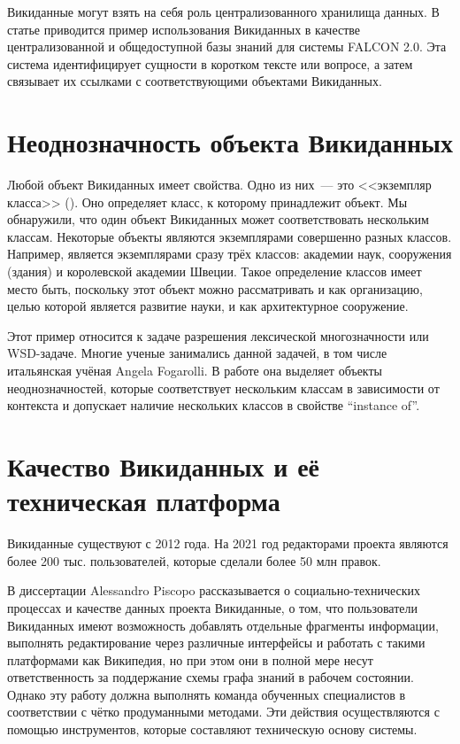 Викиданные могут взять на себя роль централизованного хранилища данных. В статье\autocite{Falcon_2.0} приводится пример использования Викиданных в качестве централизованной и общедоступной базы знаний для системы FALCON 2.0. Эта система идентифицирует сущности в коротком тексте или вопросе, а затем связывает их ссылками с соответствующими объектами Викиданных.

\section{Неоднозначность объекта Викиданных}

Любой объект Викиданных имеет свойства. Одно из них~--- это <<экземпляр класса>> (). Оно определяет класс, к которому принадлежит объект. Мы обнаружили, что один объект Викиданных может соответствовать нескольким классам.
Некоторые объекты являются экземплярами совершенно разных классов. Например,  является экземплярами сразу трёх классов: академии наук, сооружения (здания) и королевской академии Швеции. Такое определение классов имеет место быть, поскольку этот объект можно рассматривать и как организацию, целью которой является развитие науки, и как архитектурное сооружение. 

Этот пример относится к задаче разрешения лексической многозначности или WSD-задаче. Многие ученые занимались данной задачей, в том числе итальянская учёная Angela Fogarolli. В работе\autocite{Fogarolli} она выделяет объекты неоднозначностей, которые соответствует нескольким классам в зависимости от контекста и допускает наличие нескольких классов в свойстве ``instance of''.

\section{Качество Викиданных и её техническая платформа}

Викиданные существуют с 2012 года. На 2021 год редакторами проекта являются более 200 тыс. пользователей, которые сделали более 50 млн правок.

В диссертации Alessandro Piscopo\autocite{Piscopo} рассказывается о социально-технических процессах и качестве данных проекта Викиданные, о том, что пользователи Викиданных имеют возможность добавлять отдельные фрагменты информации, выполнять редактирование через различные интерфейсы и работать с такими платформами как Википедия, но при этом они в полной мере несут ответственность за поддержание схемы графа знаний\autocite{Knowledge_Graphs} в рабочем состоянии. Однако эту работу должна выполнять команда обученных специалистов в соответствии с чётко продуманными методами. Эти действия осуществляются с помощью инструментов, которые составляют техническую основу системы.

